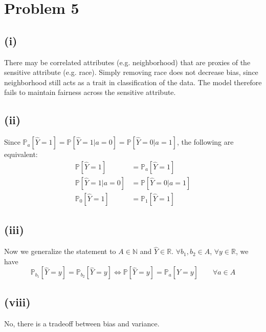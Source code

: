\documentclass[twoside,11pt]{homework}
\begin{document}
\section*{Problem 5}
\subsection*{(i)}
	There may be correlated attributes (e.g. neighborhood) that are proxies of the sensitive attribute (e.g. race). 
	Simply removing race does not decrease bias, since neighborhood still acts as a trait in classification of the data. 
	The model therefore fails to maintain fairness across the sensitive attribute.
\subsection*{(ii)}  
	Since $\mathbb{P}_a[\hat{Y}=1]=\mathbb{P}[\hat{Y}=1|a=0]=\mathbb{P}[\hat{Y}=0|a=1]$, the following are equivalent:
	\begin{align*}
		\mathbb{P}[\hat{Y}=1]&=\mathbb{P}_a[\hat{Y}=1]\\
		\mathbb{P}[\hat{Y}=1|a=0]&=\mathbb{P}[\hat{Y}=0|a=1]\\
		\mathbb{P}_0[\hat{Y}=1]&=\mathbb{P}_1[\hat{Y}=1]
	\end{align*}
\subsection*{(iii)}  
	Now we generalize the statement to $A\in \mathbb{N}$ and $\hat{Y} \in \mathbb{R}$.
	$\forall b_1, b_2  \in A$, $\forall y\in \mathbb{R}$, we have 
	$$\mathbb{P}_{b_1}[\hat{Y}=y] = \mathbb{P}_{b_2}[\hat{Y}=y] 
	\Longleftrightarrow \mathbb{P}[\hat{Y}=y] = \mathbb{P}_a[\hat{Y}=y] \qquad \forall a\in A$$
\subsection*{(viii)}  
	No, there is a tradeoff between bias and variance.
\end{document}
